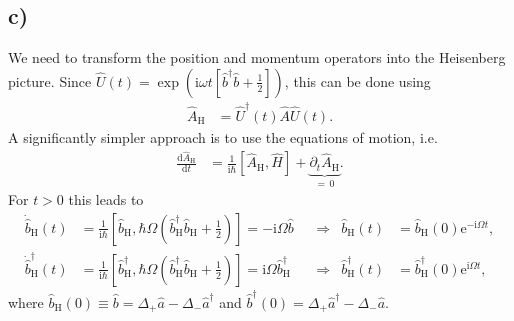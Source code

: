 \documentclass[english, parskip=full]{scrartcl}
\newcommand{\kla}{}
\newcommand{\klam}{}
\newcommand{\tecxt}{}
\renewcommand{\i}{\text{i}}
\newcommand{\e}{\text{e}}
\begin{document}
\subsection*{c)}
We need to transform the position and momentum operators into the Heisenberg picture.
Since $\hat{U}(t)=\exp\kla\left( \i\omega t\klam\left[ \hat{b}^\dagger\hat{b} + \frac{1}{2} \right] \right)$, this can be done using
\begin{align}
\hat{A}_\tecxt\text{H} &= \hat{U}^\dagger(t)\hat{A}\hat{U}(t).
\end{align}
A significantly simpler approach is to use the equations of motion, i.e.
\begin{align}
\frac{\tecxt\text{d}\hat{A}_\tecxt\text{H}}{\tecxt\text{d}t} &= \frac{1}{\i\hbar}\klam\left[ \hat{A}_\tecxt\text{H}, \hat{H} \right] + \underbrace{\partial_t\hat{A}_\tecxt\text{H}}_{=\,0}.
\end{align}
For $t>0$ this leads to
\begin{align}
\dot{\hat{b}}_\tecxt\text{H}(t) &= \frac{1}{\i\hbar}\klam\left[ \hat{b}_\tecxt\text{H}, \hbar\Omega\kla\left( \hat{b}^\dagger_\tecxt\text{H}\hat{b}_\tecxt\text{H} + \frac{1}{2} \right) \right] = -\i\Omega\hat{b} && \Rightarrow & \hat{b}_\tecxt\text{H}(t) &= \hat{b}_\tecxt\text{H}(0)\e^{-\i\Omega t},\\
\dot{\hat{b}}^\dagger_\tecxt\text{H} (t) &= \frac{1}{\i\hbar}\klam\left[ \hat{b}_\tecxt\text{H}^\dagger, \hbar\Omega\kla\left( \hat{b}_\tecxt\text{H}^\dagger\hat{b}_\tecxt\text{H} + \frac{1}{2} \right) \right] = \i\Omega\hat{b}^\dagger_\tecxt\text{H} && \Rightarrow & \hat{b}^\dagger_\tecxt\text{H}(t) &= \hat{b}^\dagger_\tecxt\text{H}(0)\e^{\i\Omega t},
\end{align}
where $\hat{b}_\tecxt\text{H}(0)\equiv\hat{b} = \Delta_+\hat{a} - \Delta_-\hat{a}^\dagger$ and $\hat{b}^\dagger(0) = \Delta_+\hat{a}^\dagger - \Delta_-\hat{a}$.\\
\end{document}
